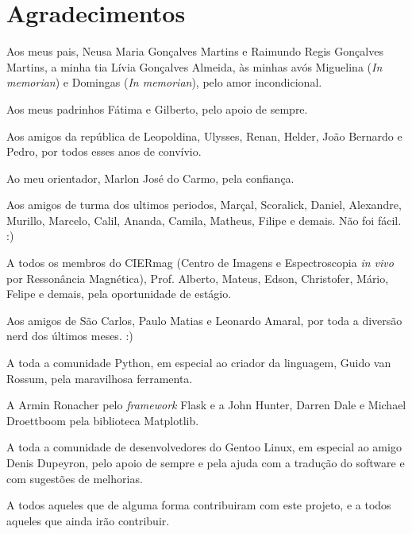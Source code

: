\chapter*{Agradecimentos}

Aos meus pais, Neusa Maria Gonçalves Martins e Raimundo Regis Gonçalves
Martins, a minha tia Lívia Gonçalves Almeida, às minhas avós Miguelina
(\textit{In memorian}) e Domingas (\textit{In memorian}), pelo amor
incondicional.

Aos meus padrinhos Fátima e Gilberto, pelo apoio de sempre.

Aos amigos da república de Leopoldina, Ulysses, Renan, Helder, João Bernardo
e Pedro, por todos esses anos de convívio.

Ao meu orientador, Marlon José do Carmo, pela confiança.

Aos amigos de turma dos ultimos periodos, Marçal, Scoralick, Daniel,
Alexandre, Murillo, Marcelo, Calil, Ananda, Camila, Matheus, Filipe e
demais. Não foi fácil. :)

A todos os membros do CIERmag (Centro de Imagens e Espectroscopia
\textit{in vivo} por Ressonância Magnética), Prof. Alberto, Mateus, Edson,
Christofer, Mário, Felipe e demais, pela oportunidade de estágio.

Aos amigos de São Carlos, Paulo Matias e Leonardo Amaral, por toda a diversão
nerd dos últimos meses. :)

A toda a comunidade Python, em especial ao criador da linguagem, Guido
van Rossum, pela maravilhosa ferramenta.

A Armin Ronacher pelo \textit{framework} Flask e a John Hunter, Darren
Dale e Michael Droettboom pela biblioteca Matplotlib.

A toda a comunidade de desenvolvedores do Gentoo Linux, em especial ao
amigo Denis Dupeyron, pelo apoio de sempre e pela ajuda com a tradução do
software e com sugestões de melhorias.

A todos aqueles que de alguma forma contribuiram com este projeto, e a
todos aqueles que ainda irão contribuir.
